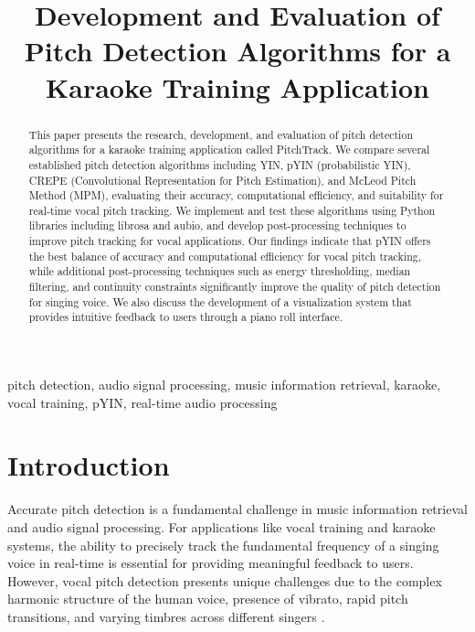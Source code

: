 \documentclass[conference]{IEEEtran}
\begin{document}
\title{Development and Evaluation of Pitch Detection Algorithms for a Karaoke Training Application\\
}

\author{
\and
{}
}

\maketitle

\begin{abstract}
This paper presents the research, development, and evaluation of pitch detection algorithms for a karaoke training application called PitchTrack. We compare several established pitch detection algorithms including YIN, pYIN (probabilistic YIN), CREPE (Convolutional Representation for Pitch Estimation), and McLeod Pitch Method (MPM), evaluating their accuracy, computational efficiency, and suitability for real-time vocal pitch tracking. We implement and test these algorithms using Python libraries including librosa and aubio, and develop post-processing techniques to improve pitch tracking for vocal applications. Our findings indicate that pYIN offers the best balance of accuracy and computational efficiency for vocal pitch tracking, while additional post-processing techniques such as energy thresholding, median filtering, and continuity constraints significantly improve the quality of pitch detection for singing voice. We also discuss the development of a visualization system that provides intuitive feedback to users through a piano roll interface.
\end{abstract}

\begin{IEEEkeywords}
pitch detection, audio signal processing, music information retrieval, karaoke, vocal training, pYIN, real-time audio processing
\end{IEEEkeywords}

\section{Introduction}
Accurate pitch detection is a fundamental challenge in music information retrieval and audio signal processing. For applications like vocal training and karaoke systems, the ability to precisely track the fundamental frequency of a singing voice in real-time is essential for providing meaningful feedback to users. However, vocal pitch detection presents unique challenges due to the complex harmonic structure of the human voice, presence of vibrato, rapid pitch transitions, and varying timbres across different singers \cite{mauch2014pyin}.
\end{document}
